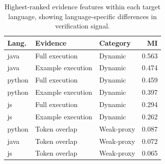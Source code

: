 \begin{table}[!htbp]
\centering
\scriptsize
\begin{tabular}{lllr}
\toprule
Lang. & Evidence & Category & MI \\
\midrule
java & Full execution & Dynamic & 0.563 \\
java & Example execution & Dynamic & 0.474 \\
python & Full execution & Dynamic & 0.459 \\
python & Example execution & Dynamic & 0.397 \\
js & Full execution & Dynamic & 0.294 \\
js & Example execution & Dynamic & 0.262 \\
python & Token overlap & Weak-proxy & 0.087 \\
java & Token overlap & Weak-proxy & 0.072 \\
js & Token overlap & Weak-proxy & 0.065 \\
\bottomrule
\end{tabular}
\vspace{0.5em}
\caption{Highest-ranked evidence features within each target language, showing language-specific differences in verification signal.}
\label{tab:language-rankings}
\end{table}
